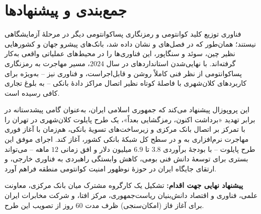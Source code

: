 \chapter{جمع‌بندی و پیشنهادها}

فناوری توزیع کلید کوانتومی و رمزنگاری پساکوانتومی دیگر در مرحلهٔ آزمایشگاهی نیستند؛ همان‌طور که در فصل‌های  و  نشان داده شد، بانک‌های پیشرو جهان و کشورهایی نظیر چین، سوئد و سنگاپور، این فناوری‌ها را در محیط‌های عملیاتی واقعی به‌کار گرفته‌اند. با نهایی‌شدن استانداردهای  در سال $2024$، مسیر مهاجرت به رمزنگاری پساکوانتومی از نظر فنی کاملاً روشن و قابل‌اجراست، و فناوری  نیز -- به‌ویژه برای کاربردهای کلان‌شهری با فاصلهٔ کوتاه نظیر اتصال مراکز دادهٔ بانکی -- به بلوغ تجاری کافی رسیده است.

این پروپوزال پیشنهاد می‌کند که جمهوری اسلامی ایران، به‌عنوان گامی پیشدستانه در برابر تهدید «برداشت اکنون، رمزگشایی بعداً»، یک طرح پایلوت کلان‌شهری در تهران را با تمرکز بر اتصال بانک مرکزی و زیرساخت‌های تسویهٔ بانکی، هم‌زمان با آغاز فوری مهاجرت نرم‌افزاری به  و  در سطح کل شبکهٔ بانکی کشور، آغاز کند. اجرای موفق این طرح پایلوت -- با بودجهٔ برآوردی $3.8$ تا $6.9$ میلیون دلار و افق زمانی $12$ ماهه -- می‌تواند بستری برای توسعهٔ دانش فنی بومی، کاهش وابستگی راهبردی به فناوری خارجی، و ارتقای جایگاه ایران در حوزهٔ نوظهور امنیت کوانتومی منطقه فراهم آورد.

\textbf{پیشنهاد نهایی جهت اقدام:} تشکیل یک کارگروه مشترک میان بانک مرکزی، معاونت علمی، فناوری و اقتصاد دانش‌بنیان ریاست‌جمهوری، مرکز افتا، و شرکت مخابرات ایران برای آغاز فاز  (امکان‌سنجی) ظرف مدت $60$ روز از تصویب این طرح.

